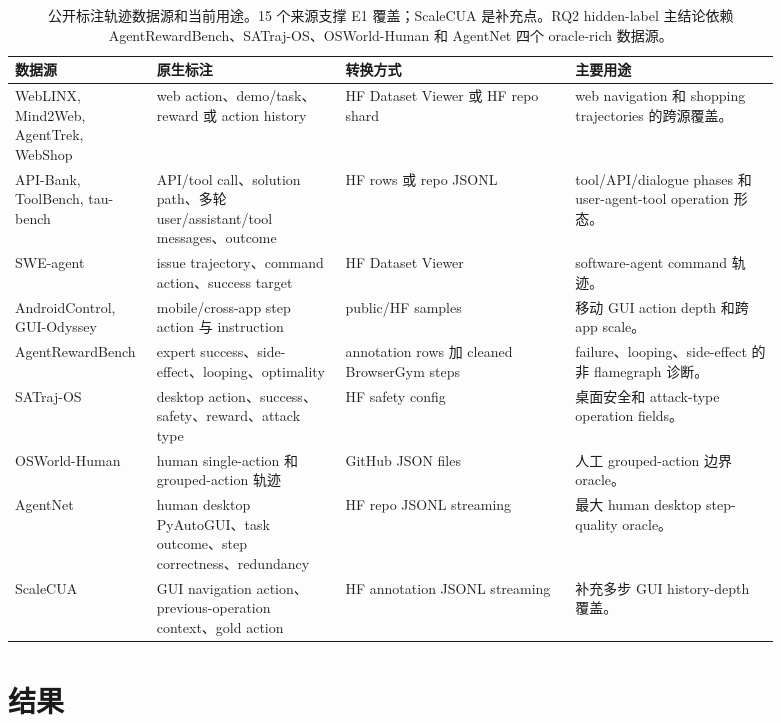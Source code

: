 \documentclass[10pt,twocolumn]{ctexart}
\begin{document}
	\begin{table}[t]
	  \centering
  \scriptsize
  \renewcommand{\arraystretch}{0.9}
  \caption{公开标注轨迹数据源和当前用途。15 个来源支撑 E1 覆盖；ScaleCUA 是补充点。RQ2 hidden-label 主结论依赖 AgentRewardBench、SATraj-OS、OSWorld-Human 和 AgentNet 四个 oracle-rich 数据源。}
  \label{tab:datasets}
  \begin{tabular}{p{0.13\linewidth}p{0.23\linewidth}p{0.28\linewidth}p{0.25\linewidth}}
    \toprule
    数据源 & 原生标注 & 转换方式 & 主要用途 \\
    \midrule
    WebLINX, Mind2Web, AgentTrek, WebShop & web action、demo/task、reward 或 action history & HF Dataset Viewer 或 HF repo shard & web navigation 和 shopping trajectories 的跨源覆盖。 \\
    API-Bank, ToolBench, tau-bench & API/tool call、solution path、多轮 user/assistant/tool messages、outcome & HF rows 或 repo JSONL & tool/API/dialogue phases 和 user-agent-tool operation 形态。 \\
    SWE-agent & issue trajectory、command action、success target & HF Dataset Viewer & software-agent command 轨迹。 \\
    AndroidControl, GUI-Odyssey & mobile/cross-app step action 与 instruction & public/HF samples & 移动 GUI action depth 和跨 app scale。 \\
    AgentRewardBench & expert success、side-effect、looping、optimality & annotation rows 加 cleaned BrowserGym steps & failure、looping、side-effect 的非 flamegraph 诊断。 \\
    SATraj-OS & desktop action、success、safety、reward、attack type & HF safety config & 桌面安全和 attack-type operation fields。 \\
    OSWorld-Human & human single-action 和 grouped-action 轨迹 & GitHub JSON files & 人工 grouped-action 边界 oracle。 \\
    AgentNet & human desktop PyAutoGUI、task outcome、step correctness、redundancy & HF repo JSONL streaming & 最大 human desktop step-quality oracle。 \\
    ScaleCUA & GUI navigation action、previous-operation context、gold action & HF annotation JSONL streaming & 补充多步 GUI history-depth 覆盖。 \\
    \bottomrule
  \end{tabular}
\end{table}

\section{结果}
\end{document}
